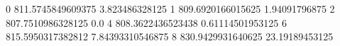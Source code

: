 0 811.5745849609375 3.823486328125
1 809.6920166015625 1.94091796875
2 807.7510986328125 0.0
4 808.3622436523438 0.61114501953125
6 815.5950317382812 7.84393310546875
8 830.9429931640625 23.19189453125

